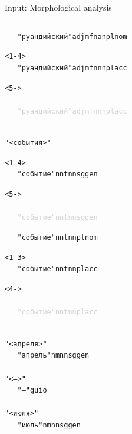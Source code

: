 \documentclass{beamer}
\begin{document}
\begin{frame}{Input: Morphological analysis}
\begin{columns}
\begin{tiny}
\begin{alltt}
\alert<5>{~~~"руандийский" adj mfn an pl nom}\\
\begin{onlyenv}<1-4>
~~~"руандийский" adj mfn nn pl acc
\end{onlyenv}
\begin{onlyenv}<5->
\textcolor{lightgray}{
~~~"руандийский" adj mfn nn pl acc
}
\end{onlyenv}
~\\
"<события>"\\
\begin{onlyenv}<1-4>
~~~"событие" n nt nn sg gen\\
\end{onlyenv}
\begin{onlyenv}<5->
\textcolor{lightgray}{
~~~"событие" n nt nn sg gen\\
}
\end{onlyenv}
\alert<5>{~~~"событие" n nt nn pl nom}\\
\begin{onlyenv}<1-3>
~~~"событие" n nt nn pl acc
\end{onlyenv}
\begin{onlyenv}<4->
\textcolor{lightgray}{
~~~"событие" n nt nn pl acc
}
\end{onlyenv}
~\\
"<апреля>"\\
~~~"апрель" n m nn sg gen
~\\
"<–>"\\
~~~"–" guio
~\\
"<июля>"\\
~~~"июль" n m nn sg gen
~\\
    \end{alltt}
  \end{tiny}
\end{columns}
\end{frame}
\end{document}
